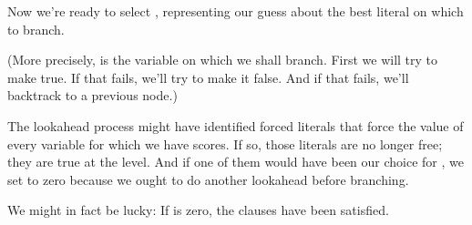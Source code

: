  Now we're ready to select , representing our guess
about
the best literal on which to branch.

(More precisely,  is the variable on which we shall
branch. First we will try to make  true. If that fails,
we'll try to make it false. And if that fails, we'll backtrack
to a previous node.)

The lookahead process might have identified forced literals that
force the value of every variable for which we have  scores.
If so, those literals are no longer free;
they are true at the  level. And if one of them would
have been our choice for , we set  to zero
because
we ought to do another lookahead before branching.

We might in fact
be lucky: If  is zero, the clauses have been satisfied.

